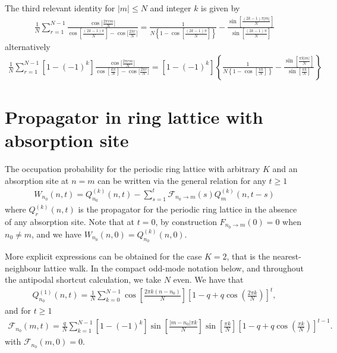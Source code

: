 \documentclass[superscriptaddress, amsmath, amssymb, aps, pre, floatfix]{revtex4-2}
\begin{document}
The third relevant identity for $|m|\leq N$ and integer $k$ is given by
\begin{align}
\frac{1}{N}\sum_{r=1}^{N-1}\frac{\cos\Big[\frac{2\pi r m}{N}\Big]}{\cos\left[\frac{(2k-1)\pi}{N}\right]-\cos\Big[\frac{2\pi r}{N}\Big]}=\frac{1}{N\left\{1-\cos\left[\frac{(2k-1)\pi}{N}\right]\right\}}-\frac{\sin\left[\frac{(2k-1)\pi |m|}{N}\right]}{\sin\left[\frac{(2k-1)\pi }{N}\right]}
\label{eq:id_3}
\end{align}
alternatively
\begin{align}
\frac{1}{N}\sum_{r=1}^{N-1}\left[1-(-1)^k\right]\frac{\cos\Big[\frac{2\pi r m}{N}\Big]}{\cos\left[\frac{k\pi}{N}\right]-\cos\Big[\frac{2\pi r}{N}\Big]}=\left[1-(-1)^k\right]\left\{\frac{1}{N\left\{1-\cos\left[\frac{\pi k}{N}\right]\right\}}-\frac{\sin\left[\frac{\pi k |m|}{N}\right]}{\sin\left[\frac{\pi k}{N}\right]}\right\}
\label{eq:id_4}
\end{align}

\section*{Propagator in ring lattice with absorption site}

The occupation probability for the periodic ring lattice with arbitrary $K$ and an absorption site at $n=m$ can be written via the general relation for any $t\geq 1$
\begin{align}
W_{n_0}(n,t)=Q^{(k)}_{n_0}(n,t)-\sum_{s=1}^{t}\mathcal{F}_{n_0\to m}(s)Q^{(k)}_{m}(n,t-s)
\label{eq:Abs_prop_ring}
\end{align}
where $Q^{(k)}_{r}(n,t)$ is the propagator for the periodic ring lattice in the absence of any absorption site. Note that at $t=0$, by construction $F_{n_0\to m}(0)=0$ when $n_0\not= m$, and we have $W_{n_0}(n,0)=Q^{(k)}_{n_0}(n,0)$.

More explicit expressions can be obtained for the case $K=2$, that is the nearest-neighbour lattice walk. In the compact odd-mode notation below, and throughout the antipodal shortcut calculation, we take \(N\) even. We have that
\begin{align}
Q^{(1)}_{n_0}(n,t)=\frac{1}{N}\sum_{k=0}^{N-1}\cos\left[\frac{2\pi k (n-n_0)}{N}\right]\left[1-q+q\cos\left(\frac{2\pi k}{N}\right)\right]^t,
\label{eq:Q1}
\end{align}
and for $t\geq 1$
\begin{align}
\mathcal{F}_{n_0}(m,t)=\frac{q}{N}\sum_{k=1}^{N-1}\left[1-(-1)^k\right]\sin\left[\frac{|m-n_0|\pi k}{N}\right]\sin\left[\frac{\pi k}{N}\right]\left[1-q+q\cos\left(\frac{\pi k}{N}\right)\right]^{t-1}.
\label{eq:fp_0}
\end{align}
with $\mathcal{F}_{n_0}(m,0)=0$.
\end{document}
